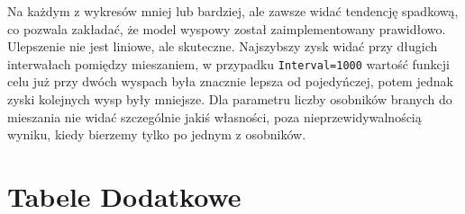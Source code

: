 \documentclass{article}
\begin{document}
Na każdym z wykresów mniej lub bardziej, ale zawsze widać tendencję spadkową, co pozwala zakładać, że model wyspowy został zaimplementowany prawidłowo. Ulepszenie nie jest liniowe, ale skuteczne. Najszybszy zysk widać przy długich interwałach pomiędzy mieszaniem, w przypadku \texttt{Interval=1000} wartość funkcji celu już przy dwóch wyspach była znacznie lepsza od pojedyńczej, potem jednak zyski kolejnych wysp były mniejsze. Dla parametru liczby osobników branych do mieszania nie widać szczególnie jakiś własności, poza nieprzewidywalnością wyniku, kiedy bierzemy tylko po jednym z osobników.

\newpage
\section{Tabele Dodatkowe}
\end{document}
